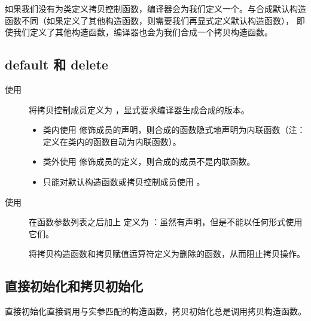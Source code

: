 \documentclass[letterpaper,10pt,english]{sphinxmanual}
\begin{document}
如果我们没有为类定义拷贝控制函数，编译器会为我们定义一个。与合成默认构造函数不同（如果定义了其他构造函数，则需要我们再显式定义默认构造函数），
即使我们定义了其他构造函数，编译器也会为我们合成一个拷贝构造函数。


\subsection{default 和 delete}
\label{\detokenize{cpp/23_copyControl:default-delete}}\begin{description}
\item[{使用 }] \leavevmode
将拷贝控制成员定义为  ，显式要求编译器生成合成的版本。
\begin{itemize}
\item {} 
类内使用  修饰成员的声明，则合成的函数隐式地声明为内联函数（注：定义在类内的函数自动为内联函数）。

\item {} 
类外使用  修饰成员的定义，则合成的成员不是内联函数。

\item {} 
只能对默认构造函数或拷贝控制成员使用  。

\end{itemize}

\item[{使用 }] \leavevmode
在函数参数列表之后加上  定义为  ：虽然有声明，但是不能以任何形式使用它们。

将拷贝构造函数和拷贝赋值运算符定义为删除的函数，从而阻止拷贝操作。

\end{description}


\subsection{直接初始化和拷贝初始化}
\label{\detokenize{cpp/23_copyControl:id3}}
直接初始化直接调用与实参匹配的构造函数，拷贝初始化总是调用拷贝构造函数。
\end{document}
